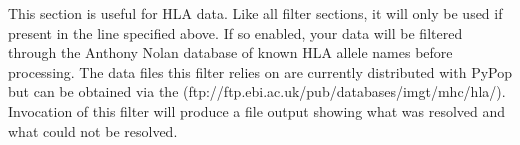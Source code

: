 \documentclass[letterpaper,10pt,english,openany,oneside]{sphinxmanual}
\begin{document}
\sphinxAtStartPar
\sphinxcode{\sphinxupquote{{[}AnthonyNolan{]}}} 

\sphinxAtStartPar
This section is  useful for HLA data. Like all filter sections, it
will only be used if present in the  line specified
above. If so enabled, your data will be filtered through the Anthony
Nolan database of known HLA allele names before processing. The data
files this filter relies on are  currently distributed with PyPop
but can be obtained via the  (ftp://ftp.ebi.ac.uk/pub/databases/imgt/mhc/hla/). Invocation of
this filter will produce a  file output showing
what was resolved and what could not be resolved.
\end{document}
